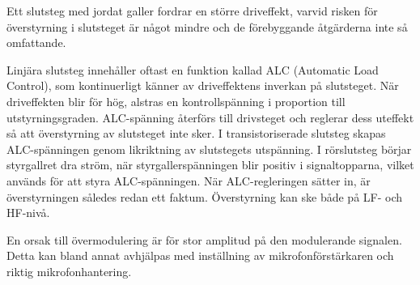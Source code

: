Ett slutsteg med jordat galler fordrar en större driveffekt, varvid
risken för överstyrning i slutsteget är något mindre och de
förebyggande åtgärderna inte så omfattande.

Linjära slutsteg innehåller oftast en funktion kallad ALC (Automatic Load
Control), som kontinuerligt känner av driveffektens inverkan på slutsteget.
När driveffekten blir för hög, alstras en kontrollspänning i proportion till
utstyrningsgraden.
ALC-spänning återförs till drivsteget och reglerar dess uteffekt så att
överstyrning av slutsteget inte sker.
I transistoriserade slutsteg skapas ALC-spänningen genom likriktning av
slutstegets utspänning.
I rörslutsteg börjar styrgallret dra ström, när styrgallerspänningen
blir positiv i signaltopparna, vilket används för att styra ALC-spänningen.
När ALC-regleringen sätter in, är överstyrningen således redan ett faktum.
Överstyrning kan ske både på LF- och HF-nivå.

En orsak till övermodulering är för stor amplitud på den modulerande signalen.
Detta kan bland annat avhjälpas med inställning av mikrofonförstärkaren och
riktig mikrofonhantering.
